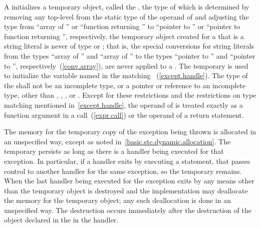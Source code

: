 \pnum
A
initializes a temporary object,
called the
,
the type of which
is determined by removing any top-level
from the static type of the operand of
and adjusting the type from ``array of
''
or ``function returning
''
to ``pointer to
''
or ``pointer to function
returning
'',
respectively.
\enternote
the temporary object created for a  that is a
string literal is never of type  or ; that is,
the special conversions for string literals from the types ``array of
'' and ``array of '' to the types
``pointer to '' and ``pointer to '',
respectively~(\ref{conv.array}), are never applied to a
.
\exitnote
The temporary is used to initialize the variable named in the matching
~(\ref{except.handle}).
The type of the  shall not be an incomplete
type, or a pointer or reference to an incomplete type, other than
, , , or
.
Except for these restrictions and the restrictions on type matching mentioned
in~\ref{except.handle}, the operand of
is treated exactly as a function argument in a call~(\ref{expr.call}) or the operand
of a return statement.

\pnum
{}%
%
%
The memory for the temporary copy of the exception being thrown is
allocated in an unspecified way, except as noted in~\ref{basic.stc.dynamic.allocation}.
The temporary persists as long as there is a handler being executed for that
exception. In particular, if a handler exits by executing a 
statement, that passes control to another handler for
the same exception, so the temporary remains.
When the last handler being executed for the exception exits by any means
other than  the temporary object is destroyed and the
implementation may deallocate the memory for the temporary object; any such
deallocation is done in an unspecified way. The destruction occurs immediately
after the destruction of the object declared in the
 in the handler.

